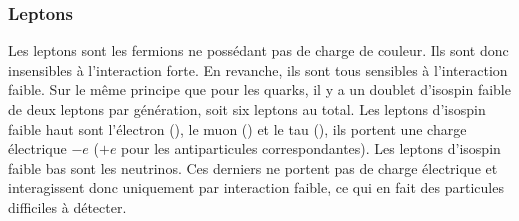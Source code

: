 \subsubsection{Leptons}\label{chapter-MS-MSSM-section-SM_ptcs-subsec-fermions-subsubsec-leptons}
Les leptons sont les fermions ne possédant pas de charge de couleur. Ils sont donc insensibles à l'interaction forte. En revanche, ils sont tous sensibles à l'interaction faible.
Sur le même principe que pour les quarks, il y a un doublet d'isospin faible de deux leptons par génération, soit six leptons au total.
Les leptons d'isospin faible haut sont l'électron (\electron), le muon (\muon) et le tau (\leptau), ils portent une charge électrique $-e$ ($+e$ pour les antiparticules correspondantes). Les leptons d'isospin faible bas sont les neutrinos. Ces derniers ne portent pas de charge électrique et interagissent donc uniquement par interaction faible, ce qui en fait des particules difficiles à détecter.


